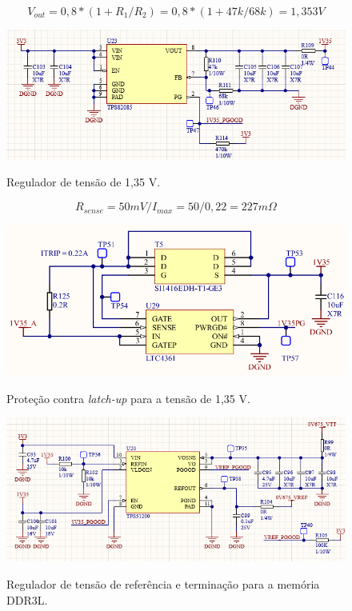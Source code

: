 \begin{equation}
	V_{out} = 0,8 * (1 + R_1/R_2) = 0,8 * (1+ 47k/68k) = 1,353 V
\end{equation} 

\begin{figure}[H]
    \centering
    \caption{Regulador de tensão de 1,35 V.}
    \includegraphics[scale=0.8]{images/1v35supp.png}
    \label{fig:1v35supp}
\end{figure}

\begin{equation}
	R_{sense} = 50 mV / I_{max} =50 / 0,22 = 227 m\Omega
\end{equation} 

\begin{figure}[H]
    \centering
    \caption{Proteção contra \textit{latch-up} para a tensão de 1,35 V.}
    \includegraphics[scale=0.8]{images/1v35ocp.png}
    \label{fig:1v35ocp}
\end{figure}


\begin{figure}[H]
    \centering
    \caption{Regulador de tensão de referência e terminação para a memória DDR3L.}
    \includegraphics[scale=0.8]{images/refsupp.png}
    \label{fig:1v35ref}
\end{figure}

